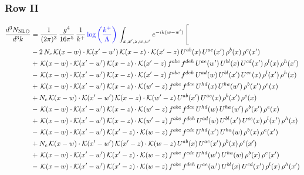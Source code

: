 \documentclass[9pt]{article}
\numberwithin{equation}{section}
\begin{document}
\subsubsection{Row II}
\begin{align}
\frac{d^{3}N_{\mathrm{NLO}}}{d^{3}k} & = \frac{1}{(2\pi)^{3}}\,\frac{g^{4}}{16\pi^{5}}\,\frac{1}{k^{+}}\,{\color{blue}\log{\left(\frac{k^{+}}{\Lambda}\right)}}\,\int_{x,x',z,w,w'}e^{-ik(w-w')}\,\Bigg[\notag\\ &  -2\,N_{c}\,\mathcal{K}(x-w)\cdot\mathcal{K}(x'-w')\,\mathcal{K}(x-z)\cdot\mathcal{K}(x'-z)\,U^{ab}(x)\,U^{ac}(x')\,\rho^{b}(x)\,\rho^{c}(x')\notag\\
& +\,\mathcal{K}(x-w)\cdot\mathcal{K}(x'-w')\,\mathcal{K}(x-z)\cdot\mathcal{K}(x'-z)\,f^{abc}\,f^{deh}\,U^{ae}(w')\,U^{bl}(x)\,U^{cd}(x')\,\rho^{l}(x)\,\rho^{h}(x')\notag\\
& -\,\mathcal{K}(x-w)\cdot\mathcal{K}(x'-w')\,\mathcal{K}(x-z)\cdot\mathcal{K}(x'-z)\,f^{abc}\,f^{deh}\,U^{ad}(w)\,U^{bl}(x')\,U^{ce}(x)\,\rho^{l}(x')\,\rho^{h}(x)\notag\\
& +\,\mathcal{K}(x-w)\cdot\mathcal{K}(x'-w')\,\mathcal{K}(x-z)\cdot\mathcal{K}(w'-z)\,f^{abc}\,f^{dce}\,U^{hd}(x)\,U^{ha}(w')\,\rho^{b}(x')\,\rho^{e}(x)\notag\\
& +N_{c}\,\mathcal{K}(x-w)\cdot\mathcal{K}(x'-w')\,\mathcal{K}(x-z)\cdot\mathcal{K}(w'-z)\,U^{ab}(x')\,U^{ac}(x)\,\rho^{b}(x')\,\rho^{c}(x)\notag\\
& -\,\mathcal{K}(x-w)\cdot\mathcal{K}(x'-w')\,\mathcal{K}(x-z)\cdot\mathcal{K}(w'-z)\,f^{abc}\,f^{dce}\,U^{hd}(w)\,U^{ha}(w')\,\rho^{b}(x')\,\rho^{e}(x)\notag\\
& +\,\mathcal{K}(x-w)\cdot\mathcal{K}(x'-w')\,\mathcal{K}(x-z)\cdot\mathcal{K}(w'-z)\,f^{abc}\,f^{deh}\,U^{ad}(w)\,U^{bl}(x')\,U^{ce}(x)\,\rho^{l}(x')\,\rho^{h}(x)\notag\\
& -\,\mathcal{K}(x-w)\cdot\mathcal{K}(x'-w')\,\mathcal{K}(x'-z)\cdot\mathcal{K}(w-z)\,f^{abc}\,f^{cde}\,U^{hd}(x')\,U^{ha}(w)\,\rho^{b}(x)\,\rho^{e}(x')\notag\\
& +N_{c}\,\mathcal{K}(x-w)\cdot\mathcal{K}(x'-w')\,\mathcal{K}(x'-z)\cdot\mathcal{K}(w-z)\,U^{ab}(x)\,U^{ac}(x')\,\rho^{b}(x)\,\rho^{c}(x')\notag\\
& +\,\mathcal{K}(x-w)\cdot\mathcal{K}(x'-w')\,\mathcal{K}(x'-z)\cdot\mathcal{K}(w-z)\,f^{abc}\,f^{cde}\,U^{hd}(w')\,U^{ha}(w)\,\rho^{b}(x)\,\rho^{e}(x')\notag\\
& -\,\mathcal{K}(x-w)\cdot\mathcal{K}(x'-w')\,\mathcal{K}(x'-z)\cdot\mathcal{K}(w-z)\,f^{abc}\,f^{deh}\,U^{ae}(w')\,U^{bl}(x)\,U^{cd}(x')\,\rho^{l}(x)\,\rho^{h}(x')\notag\\

\end{align}
\end{document}
